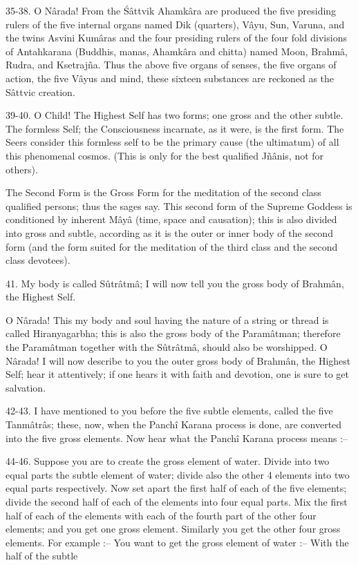 35-38. O N\^arada! From the \'S\^attvik Ahamk\^ara are produced the five presiding rulers of the five internal organs named Dik (quarters), V\^ayu, Sun, Varuna, and the twins Asvini Kum\^aras and the four presiding rulers of the four fold divisions of Antahkarana (Buddhis, manas, Ahamk\^ara and chitta) named Moon, Brahm\^a, Rudra, and Ksetraj\~na. Thus the above five organs of senses, the five organs of action, the five V\^ayus and mind, these sixteen substances are reckoned as the S\^attvic creation.

39-40. O Child! The Highest Self has two forms; one gross and the other subtle. The formless Self; the Consciousness incarnate, as it were, is the first form. The Seers consider this formless self to be the primary cause (the ultimatum) of all this phenomenal cosmos. (This is only for the best qualified J\~n\^anis, not for others).

The Second Form is the Gross Form for the meditation of the second class qualified persons; thus the sages say. This second form of the Supreme Goddess is conditioned by inherent M\^ay\^a (time, space and causation); this is also divided into gross and subtle, according as it is the outer or inner body of the second form (and the form suited for the meditation of the third class and the second class devotees).

41. My body is called Sûtr\^atm\^a; I will now tell you the gross body of Brahm\^an, the Highest Self.

O N\^arada! This my body and soul having the nature of a string or thread is called Hiranyagarbha; this is also the gross body of the Param\^atman; therefore the Param\^atman together with the Sûtr\^atm\^a, should also be worshipped. O N\^arada! I will now describe to you the outer gross body of Brahm\^an, the Highest Self; hear it attentively; if one hears it with faith and devotion, one is sure to get salvation.

42-43. I have mentioned to you before the five subtle elements, called the five Tanm\^atr\^as; these, now, when the Panch\^i Karana process is done, are converted into the five gross elements. Now hear what the Panch\^i Karana process means :--

44-46. Suppose you are to create the gross element of water. Divide into two equal parts the subtle element of water; divide also the other 4 elements into two equal parts respectively. Now set apart the first half of each of the five elements; divide the second half of each of the elements into four equal parts. Mix the first half of each of the elements with each of the fourth part of the other four elements; and you get one gross element. Similarly you get the other four gross elements. For example :-- You want to get the gross element of water :-- With the half of the subtle

